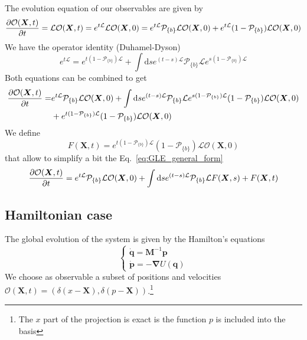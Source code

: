 \documentclass{article}
\numberwithin{equation}{section} %
\newcommand{\f}[2]{\mathchoice%
			{\dfrac{#1}{#2}}
	    	{\dfrac{#1}{#2}}
			{\frac{#1}{#2}}
			{\frac{#1}{#2}}}
\newcommand{\Dp}[3][]{\ifthenelse{\equal{#1}{}}{\ensuremath{\f{\partial#2}{\partial#3}}}
  {\ensuremath{\f{\partial^{#1}#2}{\partial{#3}^{#1}}}}}
\newcommand{\vect}[1]{\bm{#1}}
\newcommand{\1}{\mathds{1}} %
\newcommand{\dd}{\mathrm{d}} %
\begin{document}
The evolution equation of our observables are given by
\begin{equation}
    \label{eq:obs_evol}
    \Dp{\mathcal{O}(\vect{X},t)}{t} = \mathcal{L} \mathcal{O}(\vect{X},t) = e^{t\mathcal{L}}\mathcal{L} \mathcal{O}(\vect{X},0) = e^{t\mathcal{L}}\mathcal{P}_{\{b\}}\mathcal{L} \mathcal{O}(\vect{X},0)+e^{t\mathcal{L}}(1-\mathcal{P}_{\{b\}})\mathcal{L} \mathcal{O}(\vect{X},0)
\end{equation}
We have the operator identity (Duhamel-Dyson)
\begin{equation}
    \label{eq:operator_iden}
    e^{t\mathcal{L}} = e^{t(1-\mathcal{P}_{\{b\}})\mathcal{L}} + \int \dd s e^{(t-s)\mathcal{L}} \mathcal{P}_{\{b\}} \mathcal{L} e^{s(1-\mathcal{P}_{\{b\}})\mathcal{L}}
\end{equation}
Both equations can be combined to get
\begin{align}
    \label{eq:GLE_general_form}
     \Dp{\mathcal{O}(\vect{X},t)}{t} =&  e^{t\mathcal{L}}\mathcal{P}_{\{b\}}\mathcal{L} \mathcal{O}(\vect{X},0)+\int \dd s e^{(t-s)\mathcal{L}} \mathcal{P}_{\{b\}} \mathcal{L} e^{s(1-\mathcal{P}_{\{b\}})\mathcal{L}} (1-\mathcal{P}_{\{b\}})\mathcal{L} \mathcal{O}(\vect{X},0)\\
     &+e^{t(1-\mathcal{P}_{\{b\}})\mathcal{L}}(1-\mathcal{P}_{\{b\}})\mathcal{L} \mathcal{O}(\vect{X},0)\nonumber
\end{align}
We define
\begin{equation}
    \label{eq:noise_gle}
    F(\vect{X},t) = e^{t(1-\mathcal{P}_{\{b\}})\mathcal{L}}(1-\mathcal{P}_{\{b\}})\mathcal{L} \mathcal{O}(\vect{X},0)
\end{equation}
that allow to simplify a bit the Eq.~\eqref{eq:GLE_general_form}
\begin{equation}
    \label{eq:GLE_general_form_noise}
     \Dp{\mathcal{O}(\vect{X},t)}{t} =  e^{t\mathcal{L}}\mathcal{P}_{\{b\}}\mathcal{L} \mathcal{O}(\vect{X},0)+\int \dd s e^{(t-s)\mathcal{L}} \mathcal{P}_{\{b\}} \mathcal{L} F(\vect{X},s)+
     F(\vect{X},t)
\end{equation}

\subsection{Hamiltonian case}
The global evolution of the system is given by the Hamilton's equations
\begin{equation}
    \label{eq:Hamilton}
    \begin{cases}
    \dot{\bm{q}}= \bm{M}^{-1} \bm{p} \\
    \dot{\bm{p}} = -\bm{\nabla} U(\bm{q})
    \end{cases}
\end{equation}
We choose as observable a subset of positions and velocities $\mathcal{O}(\vect{X},t) = (\delta(x-\vect{X}),\delta(p-\vect{X}))$.\footnote{The $x$ part of the projection is exact is the function $p$ is included into the basis}
\end{document}
